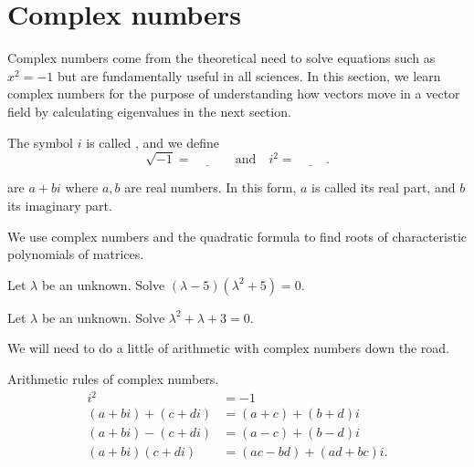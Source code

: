 \documentclass[../main.tex]{subfiles}
\begin{document}
 \section{Complex numbers}

Complex numbers come from the theoretical need to solve equations such as \(x^{2} = -1\) but are fundamentally useful in all sciences.  In this section, we learn complex numbers for the purpose of understanding how vectors move in a vector field by calculating eigenvalues in the next section.

\begin{definition} \label{def:complex-numbers}
  The symbol \(i\) is called , and we define 
  \[
    \sqrt{-1} = \underline{\hspace{1cm}}
    \quad\text{and}\quad 
    i^{2} = \underline{\hspace{1cm}}.
  \]

   are \(a + bi\) where \(a,b\) are real numbers. In this form, \(a\) is called its real part, and \(b\) its imaginary part.
\end{definition}

\faStar{} We use complex numbers and the quadratic formula to find roots of characteristic polynomials of matrices.
\begin{example} \label{ex:complex-solve-cubic}
  Let \(\lambda\) be an unknown. Solve \((\lambda - 5) (\lambda^{2} + 5) = 0\).

\end{example}

\begin{example} \label{ex:complex-solve-quadratic}
  Let \(\lambda\) be an unknown. Solve \(\lambda^{2} + \lambda + 3 = 0\).

  \blanks*
\end{example}
\clearpage

We will need to do a little of arithmetic with complex numbers down the road.

\begin{definition} \label{def:complex-arithmetic}
  Arithmetic rules of complex numbers.
  \begin{align*}
    i^{2} &= -1 \\
    (a + bi) + (c + di) &= (a + c) + (b + d)i \\
    (a + bi) - (c + di) &= (a - c) + (b - d)i \\
    (a + bi)(c + di) &= (ac - bd) + (ad + bc)i.
  \end{align*}
\end{definition}
\end{document}
